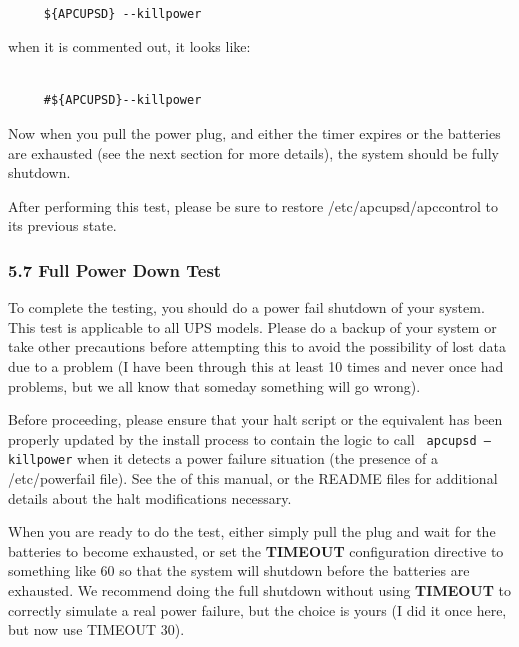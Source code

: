 \footnotesize
\begin{verbatim}
     
     ${APCUPSD} --killpower
\end{verbatim}
\normalsize

when it is commented out, it looks like: 

\footnotesize
\begin{verbatim}
     
     #${APCUPSD}--killpower
\end{verbatim}
\normalsize

Now when you pull the power plug, and either the timer expires or the
batteries are exhausted (see the next section for more details), the system
should be fully shutdown.  

After performing this test, please be sure to restore /etc/apcupsd/apccontrol
to its previous state. 

\label{Full-Power-Down-Test}

\subsubsection*{5.7 Full Power Down Test}

\label{index-Power-down-test-97}
\label{index-Testing_002c-Power-down-98}
To complete the testing, you should do a power fail shutdown of your system.
This test is applicable to all UPS models. Please do a backup of your system
or take other precautions before attempting this to avoid the possibility of
lost data due to a problem (I have been through this at least 10 times and
never once had problems, but we all know that someday something will go
wrong).  

Before proceeding, please ensure that your halt script or the equivalent has
been properly updated by the install process to contain the logic to call {\tt
apcupsd --killpower} when it detects a power failure situation (the presence
of a /etc/powerfail file). See the 
 of this manual, or the
README files for additional details about the halt modifications necessary.  

When you are ready to do the test, either simply pull the plug and wait for
the batteries to become exhausted, or set the {\bf TIMEOUT} configuration
directive to something like 60 so that the system will shutdown before the
batteries are exhausted. We recommend doing the full shutdown without using
{\bf TIMEOUT} to correctly simulate a real power failure, but the choice is
yours (I did it once here, but now use TIMEOUT 30).  

